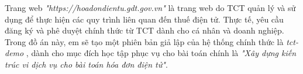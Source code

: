 Trang web  \emph{"https://hoadondientu.gdt.gov.vn"}          là trang web do TCT quản lý và sử dụng để thực hiện các quy trình liên quan đến thuế điện tử. Thực tế, yêu cầu đăng ký và phê duyệt chính thức từ TCT dành cho cá nhân và doanh nghiệp.   Trong đồ án này, em sẽ tạo     một phiên bản giả lập của hệ thống chính thức là \emph{ tct-demo   } , dành cho mục đích học tập phục vụ cho bài toán chính là   \emph{"Xây dựng kiến trúc vi dịch vụ cho bài toán hóa đơn điện tử"}.

